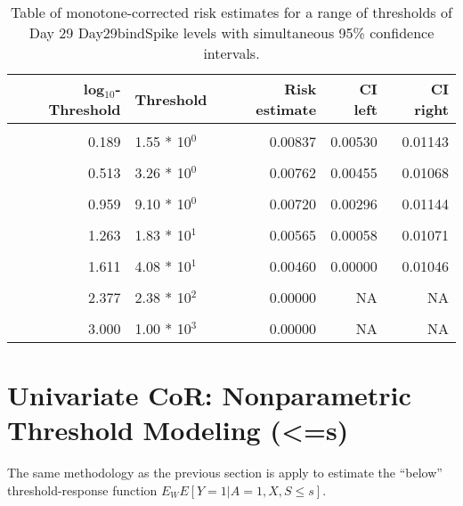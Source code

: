 \documentclass[]{article}
\begin{document}
\begin{table}[!h]

\caption{\label{tab:unnamed-chunk-80}Table of monotone-corrected risk estimates for a range of thresholds of Day 29 Day29bindSpike levels with simultaneous 95\% confidence intervals.}
\centering
\begin{tabular}[t]{rlrrr}
\toprule
log$_{10}$-Threshold & Threshold & Risk estimate & CI left & CI right\\
\midrule
\cellcolor{gray!6}{-0.813} & \cellcolor{gray!6}{1.54 * 10$^{1}$} & \cellcolor{gray!6}{0.00878} & \cellcolor{gray!6}{0.00590} & \cellcolor{gray!6}{0.01166}\\
0.189 & 1.55 * 10$^{0}$ & 0.00837 & 0.00530 & 0.01143\\
\cellcolor{gray!6}{0.341} & \cellcolor{gray!6}{2.19 * 10$^{0}$} & \cellcolor{gray!6}{0.00820} & \cellcolor{gray!6}{0.00514} & \cellcolor{gray!6}{0.01125}\\
0.513 & 3.26 * 10$^{0}$ & 0.00762 & 0.00455 & 0.01068\\
\cellcolor{gray!6}{0.792} & \cellcolor{gray!6}{6.19 * 10$^{0}$} & \cellcolor{gray!6}{0.00749} & \cellcolor{gray!6}{0.00402} & \cellcolor{gray!6}{0.01096}\\
0.959 & 9.10 * 10$^{0}$ & 0.00720 & 0.00296 & 0.01144\\
\cellcolor{gray!6}{1.113} & \cellcolor{gray!6}{1.30 * 10$^{1}$} & \cellcolor{gray!6}{0.00639} & \cellcolor{gray!6}{0.00152} & \cellcolor{gray!6}{0.01126}\\
1.263 & 1.83 * 10$^{1}$ & 0.00565 & 0.00058 & 0.01071\\
\cellcolor{gray!6}{1.491} & \cellcolor{gray!6}{3.10 * 10$^{1}$} & \cellcolor{gray!6}{0.00460} & \cellcolor{gray!6}{0.00000} & \cellcolor{gray!6}{0.00970}\\
1.611 & 4.08 * 10$^{1}$ & 0.00460 & 0.00000 & 0.01046\\
\cellcolor{gray!6}{1.729} & \cellcolor{gray!6}{5.36 * 10$^{1}$} & \cellcolor{gray!6}{0.00397} & \cellcolor{gray!6}{0.00000} & \cellcolor{gray!6}{0.00866}\\
2.377 & 2.38 * 10$^{2}$ & 0.00000 & NA & NA\\
\cellcolor{gray!6}{2.699} & \cellcolor{gray!6}{5.00 * 10$^{2}$} & \cellcolor{gray!6}{0.00000} & \cellcolor{gray!6}{NA} & \cellcolor{gray!6}{NA}\\
3.000 & 1.00 * 10$^{3}$ & 0.00000 & NA & NA\\
\bottomrule
\end{tabular}
\end{table}

\clearpage
\clearpage

\newpage

\hypertarget{univariate-cor-nonparametric-threshold-modeling-s-1}{%
\section{Univariate CoR: Nonparametric Threshold Modeling
(\textless{}=s)}\label{univariate-cor-nonparametric-threshold-modeling-s-1}}

The same methodology as the previous section is apply to estimate the
``below'' threshold-response function \(E_WE[Y=1|A=1,X,S \leq s].\)
\end{document}
